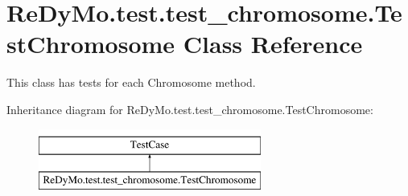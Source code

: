 \hypertarget{classReDyMo_1_1test_1_1test__chromosome_1_1TestChromosome}{}\section{Re\+Dy\+Mo.\+test.\+test\+\_\+chromosome.\+Test\+Chromosome Class Reference}
\label{classReDyMo_1_1test_1_1test__chromosome_1_1TestChromosome}


This class has tests for each Chromosome method.  


Inheritance diagram for Re\+Dy\+Mo.\+test.\+test\+\_\+chromosome.\+Test\+Chromosome\+:\begin{figure}[H]
\begin{center}
\leavevmode
\includegraphics[height=2.000000cm]{classReDyMo_1_1test_1_1test__chromosome_1_1TestChromosome}
\end{center}
\end{figure}
